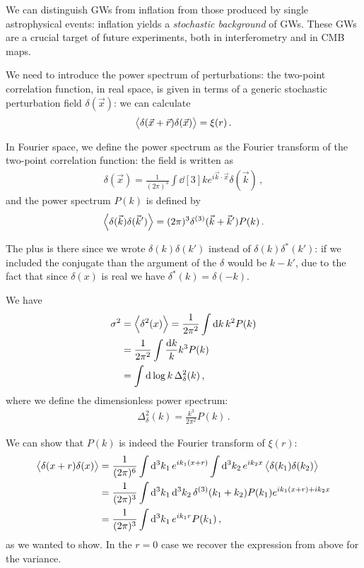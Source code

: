 \documentclass[main.tex]{subfiles}
\begin{document}
We can distinguish GWs from inflation from those produced by single astrophysical events: inflation yields a \emph{stochastic background} of GWs. 
These GWs are a crucial target of future experiments, both in interferometry and in CMB maps. 

We need to introduce the power spectrum of perturbations: 
the two-point correlation function, in real space, is given in terms of a generic stochastic perturbation field \(\delta (\vec{x})\): we can calculate 
%
\begin{align}
\expval{ \delta (\vec{x} + \vec{r}) \delta (\vec{x})} = \xi (r)
\,.
\end{align}

In Fourier space, we define the power spectrum as the Fourier transform of the two-point correlation function: the field is written as 
%
\begin{align}
\delta (\vec{x}) = \frac{1}{(2\pi )^3} \int \dd[3]{k} e^{i \vec{k} \cdot \vec{x}} \delta (\vec{k})
\,,
\end{align}
%
and the power spectrum \(P(k)\) is defined by
%
\begin{align}
\expval{ \delta (\vec{k}) \delta (\vec{k}')} = (2\pi )^3 \delta^{(3)} (\vec{k} + \vec{k}') P(k)
\,.
\end{align}

The plus is there since we wrote \(\delta (k) \delta (k')\) instead of \(\delta(k) \delta^{*}(k')\): if we included the conjugate than the argument of the \(\delta \) would be \(k - k'\), due to the fact that since \(\delta (x)\) is real we have \(\delta^{*}(k) = \delta (-k)\). 

We have 
%
\begin{align}
\sigma^2 &= \expval{ \delta^2(x)}
= \frac{1}{2 \pi^2} \int \dd{k} k^2 P(k)  \\
&= \frac{1}{2 \pi^2} \int \frac{ \dd{k}}{k} k^3 P(k)  \\
&= \int \dd{\log k } \Delta^2_\delta  (k)
\,,
\end{align}
%
where we define the dimensionless power spectrum: 
%
\begin{align}
\Delta^2_\delta (k) = \frac{k^3}{2 \pi^2} P(k)
\,.
\end{align}

We can show that \(P(k)\) is indeed the Fourier transform of \(\xi (r)\): 
%
\begin{align}
\expval{ \delta (x+r) \delta (x)} &= \frac{1}{(2 \pi )^6}
\int \dd[3]{k_1 } e^{i k_1 (x+r)} \int \dd[3]{k_2 } e^{i k_2 x} 
\expval{\delta (k_1 ) \delta (k_2 )}  \\
&= \frac{1}{(2 \pi )^3} \int \dd[3]{k_1 } \dd[3]{k_2 } \delta^{(3)} (k_1 + k_2 ) P(k_1 ) e^{i k_1 (x+r) + i k_2 x}  \\
&= \frac{1}{(2 \pi )^3} \int \dd[3]{k_1 } e^{i k_1 r} P(k_1 )
\,,
\end{align}
%
as we wanted to show. 
In the \(r = 0\) case we recover the expression from above for the variance. 
\end{document}
